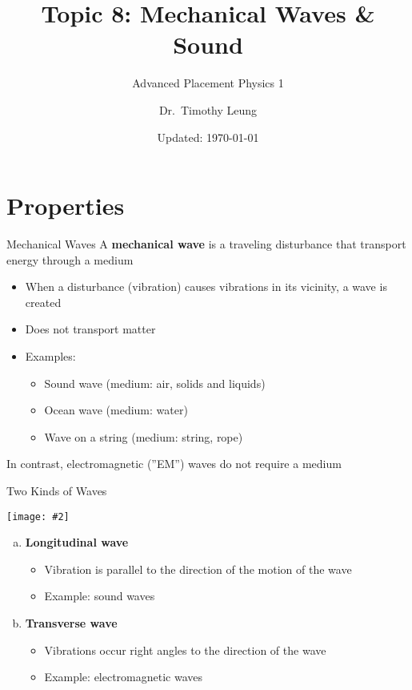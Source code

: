 \documentclass[12pt,aspectratio=169]{beamer}
\title{Topic 8: Mechanical Waves \& Sound}
\subtitle{Advanced Placement Physics 1}
\author[TML]{Dr.\ Timothy Leung}
\institute{Olympiads School}
\date{Updated: \today}
\newcommand{\pic}[2]{\texttt{[image: \#2]}}
\begin{document}
\begin{frame}
  \titlepage
\end{frame}



\section{Properties}

\begin{frame}{Mechanical Waves}
  A \textbf{mechanical wave} is a traveling disturbance that transport energy
  through a medium
  \begin{itemize}
  \item When a disturbance (vibration) causes vibrations in its vicinity, a
    wave is created
  \item Does not transport matter
  \item Examples:
    \begin{itemize}
    \item Sound wave (medium: air, solids and liquids)
    \item Ocean wave (medium: water)
    \item Wave on a string (medium: string, rope)
    \end{itemize}
  \end{itemize}
  In contrast, electromagnetic (''EM'') waves do not require a medium
\end{frame}




\begin{frame}{Two Kinds of Waves}
  \begin{center}
    \pic{.6}{main-qimg}
  \end{center}
  \begin{enumerate}[a.]
  \item\textbf{Longitudinal wave}
    \begin{itemize}
    \item Vibration is parallel to the direction of the motion of the wave
    \item Example: sound waves
    \end{itemize}
  \item\textbf{Transverse wave}
    \begin{itemize}
    \item Vibrations occur right angles to the direction of the wave
    \item Example: electromagnetic waves
    \end{itemize}
  \end{enumerate}
\end{frame}
\end{document}
